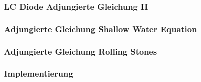 \begin{frame}
\frametitle{LC Diode Adjungierte Gleichung II}
\begin{minipage}[c]{0.45\textwidth}
\centering
\scalebox{0.9}{}
\scalebox{0.9}{}
\end{minipage}
\begin{minipage}[c]{0.45\textwidth}
\centering
\scalebox{0.9}{}
\scalebox{0.9}{}
\end{minipage}
\end{frame}


\begin{frame}
\frametitle{Adjungierte Gleichung Shallow Water Equation}
\begin{minipage}[c]{0.45\textwidth}
\centering
\scalebox{0.9}{}
\scalebox{0.9}{}
\end{minipage}
\begin{minipage}[c]{0.45\textwidth}
\centering
\scalebox{0.9}{}
\scalebox{0.9}{}
\end{minipage}
\end{frame}





\begin{frame}
\frametitle{Adjungierte Gleichung Rolling Stones}
\begin{minipage}[c]{0.45\textwidth}
\centering
\scalebox{1.1}{}
\end{minipage}
\begin{minipage}[c]{0.45\textwidth}
\centering
\scalebox{1.1}{}
\end{minipage}
\end{frame}




\begin{frame}[fragile]
\frametitle{Implementierung}
\cite{openblas}
\cite{armadillo}
\cite{ADOLCmanual}
\cite{boeck14}
\end{frame}

\setcounter{framenumber}{\value{finalframe}}
